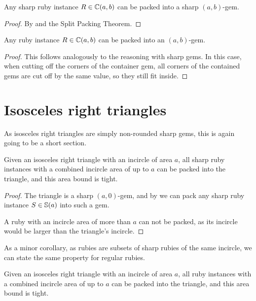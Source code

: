\documentclass[a4paper,style=print,oneside,bibliography=totoc,nexus,lnum,extramargin]{tubsbook}
\begin{document}

\begin{theorem}\label{th:sharp-gem}
    Any sharp ruby instance $R \in \mathbb{C}(a,b)$ can be packed into a sharp $(a,b)$-gem.
\end{theorem}

\begin{proof}
    By  and the Split Packing Theorem.
\end{proof}

\begin{theorem}\label{th:gem}
    Any ruby instance $R \in \mathbb{C}(a,b)$ can be packed into an $(a,b)$-gem.
\end{theorem}

\begin{proof}
    This follows analogously to the reasoning with sharp gems. In this case, when cutting off the corners of the container gem, all corners of the contained gems are cut off by the same value, so they still fit inside.
\end{proof}

\section{Isosceles right triangles}

As isosceles right triangles are simply non-rounded sharp gems, this is again going to be a short section.

\begin{theorem}\label{th:iso}
    Given an isosceles right triangle with an incircle of area $a$, all sharp ruby instances with a combined incircle area of up to $a$ can be packed into the triangle, and this area bound is tight.
\end{theorem}

\begin{proof}
    The triangle is a sharp $(a,0)$-gem, and by  we can pack any sharp ruby instance $S \in \mathbb{S}(a)$ into such a gem.

    A ruby with an incircle area of more than $a$ can not be packed, as its incircle would be larger than the triangle's incircle.
\end{proof}

As a minor corollary, as rubies are subsets of sharp rubies of the same incircle, we can state the same property for regular rubies.

\begin{corollary}
    Given an isosceles right triangle with an incircle of area $a$, all ruby instances with a combined incircle area of up to $a$ can be packed into the triangle, and this area bound is tight.
\end{corollary}
\end{document}
